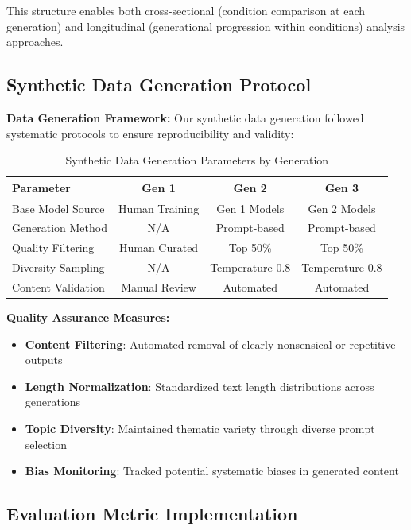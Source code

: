 \documentclass{article}
\begin{document}
This structure enables both cross-sectional (condition comparison at each generation) and longitudinal (generational progression within conditions) analysis approaches.

\subsection{Synthetic Data Generation Protocol}

\textbf{Data Generation Framework:}
Our synthetic data generation followed systematic protocols to ensure reproducibility and validity:

\begin{table}[H]
\centering
\caption{Synthetic Data Generation Parameters by Generation}
\label{tab:data_generation_params}
\begin{tabular}{lccc}
\toprule
\textbf{Parameter} & \textbf{Gen 1} & \textbf{Gen 2} & \textbf{Gen 3} \\
\midrule
Base Model Source & Human Training & Gen 1 Models & Gen 2 Models \\
Generation Method & N/A & Prompt-based & Prompt-based \\
Quality Filtering & Human Curated & Top 50\% & Top 50\% \\
Diversity Sampling & N/A & Temperature 0.8 & Temperature 0.8 \\
Content Validation & Manual Review & Automated & Automated \\
\bottomrule
\end{tabular}
\end{table}

\textbf{Quality Assurance Measures:}
\begin{itemize}
    \item \textbf{Content Filtering}: Automated removal of clearly nonsensical or repetitive outputs
    \item \textbf{Length Normalization}: Standardized text length distributions across generations
    \item \textbf{Topic Diversity}: Maintained thematic variety through diverse prompt selection
    \item \textbf{Bias Monitoring}: Tracked potential systematic biases in generated content
\end{itemize}

\subsection{Evaluation Metric Implementation}
\end{document}
